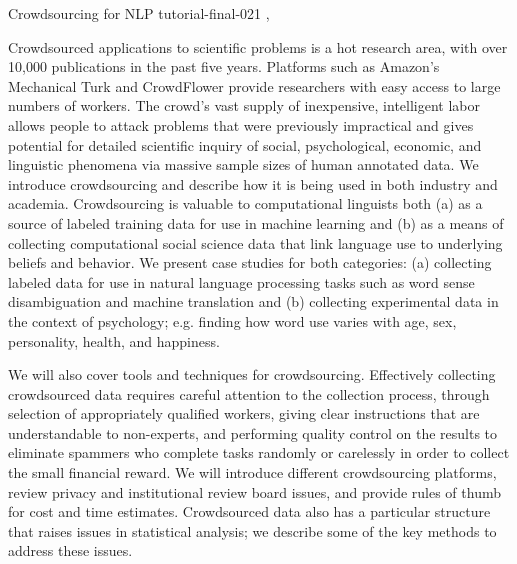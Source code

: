 \begin{tutorial}
  {Crowdsourcing for NLP}
  {tutorial-final-021}
  {\daydateyear, \tutorialmorningtime}
  {\TutLocB}

Crowdsourced applications to scientific problems is a hot research area, with over 10,000 publications in the past five years. Platforms such as Amazon’s Mechanical Turk and CrowdFlower provide researchers with easy access to large numbers of workers. The crowd’s vast supply of inexpensive, intelligent labor allows people to attack problems that were previously impractical and gives potential for detailed scientific inquiry of social, psychological, economic, and linguistic phenomena via massive sample sizes of human annotated data. We introduce crowdsourcing and describe how it is being used in both industry and academia. Crowdsourcing is valuable to computational linguists both (a) as a source of labeled training data for use in machine learning and (b) as a means of collecting computational social science data that link language use to underlying beliefs and behavior. We present case studies for both categories: (a) collecting labeled data for use in natural language processing tasks such as word sense disambiguation and machine translation and (b) collecting experimental data in the context of psychology; e.g. finding how word use varies with age, sex, personality, health, and happiness.

We will also cover tools and techniques for crowdsourcing. Effectively collecting crowdsourced data requires careful attention to the collection process, through selection of appropriately qualified workers, giving clear instructions that are understandable to non-experts, and performing quality control on the results to eliminate spammers who complete tasks randomly or carelessly in order to collect the small financial reward. We will introduce different crowdsourcing platforms, review privacy and institutional review board issues, and provide rules of thumb for cost and time estimates. Crowdsourced data also has a particular structure that raises issues in statistical analysis; we describe some of the key methods to address these issues.

\end{tutorial}

